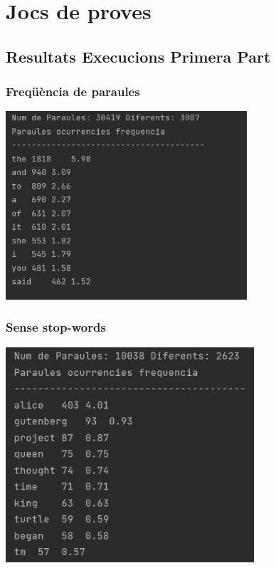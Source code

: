 \documentclass[11pt,a4paper]{article}
\begin{document}
\section{Jocs de proves}

	\subsection{Resultats Execucions Primera Part}
	
		\subsubsection{Freqüència de paraules}
		
			\begin{center}
				\includegraphics[height=7cm]{captures/primeraPart/freq/resultatFreq.jpg}
			\end{center}
		
		\subsubsection{Sense stop-words}
		
			\begin{center}
				\includegraphics[height=8cm]{captures/primeraPart/sensestopwords/execucio.jpg}
			\end{center}
		
\end{document}
